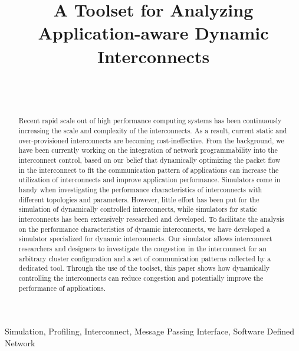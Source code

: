 \documentclass[conference]{IEEEtran}
\begin{document}
\title{A Toolset for Analyzing Application-aware Dynamic Interconnects}

\author{%
     \\
     \\
}

\maketitle

\begin{abstract}
    Recent rapid scale out of high performance computing systems has
    been continuously increasing the scale and complexity of the
    interconnects. As a result, current static and over-provisioned
    interconnects are becoming cost-ineffective. From the background, we have
    been currently working on the integration of network programmability into
    the interconnect control, based on our belief that dynamically optimizing
    the packet flow in the interconnect to fit the communication pattern of
    applications can increase the utilization of interconnects and improve
    application performance. Simulators come in handy when investigating the
    performance characteristics of interconnects with different topologies and
    parameters. However, little effort has been put for the simulation of
    dynamically controlled interconnects, while simulators for static
    interconnects has been extensively researched and developed. To facilitate
    the analysis on the performance characteristics of dynamic interconnects,
    we have developed a simulator specialized for dynamic interconnects. Our
    simulator allows interconnect researchers and designers to investigate the
    congestion in the interconnect for an arbitrary cluster configuration and
    a set of communication patterns collected by a dedicated tool. Through the
    use of the toolset, this paper shows how dynamically controlling the
    interconnects can reduce congestion and potentially improve the
    performance of applications.
\end{abstract}

\begin{IEEEkeywords}
    Simulation, Profiling, Interconnect, Message Passing Interface, Software
    Defined Network
\end{IEEEkeywords}
\end{document}
